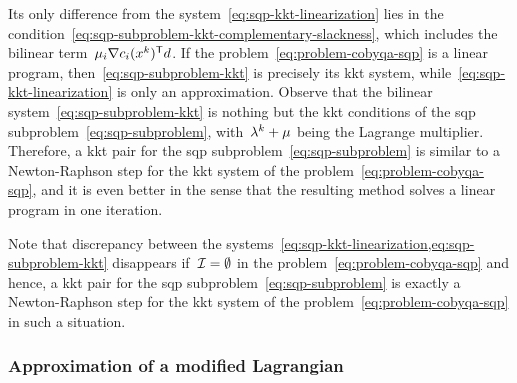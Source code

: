 Its only difference from the system~\cref{eq:sqp-kkt-linearization} lies in the condition~\cref{eq:sqp-subproblem-kkt-complementary-slackness}, which includes the bilinear term~$\mu_i \nabla \con{i}(\iter[k])^{\T} \step$.
If the problem~\cref{eq:problem-cobyqa-sqp} is a linear program, then~\cref{eq:sqp-subproblem-kkt} is precisely its \gls{kkt} system, while~\cref{eq:sqp-kkt-linearization} is only an approximation.
Observe that the bilinear system~\cref{eq:sqp-subproblem-kkt} is nothing but the \gls{kkt} conditions of the \gls{sqp} subproblem~\cref{eq:sqp-subproblem}, with~$\lm[k] + \mu$ being the Lagrange multiplier.
Therefore, a \gls{kkt} pair for the \gls{sqp} subproblem~\cref{eq:sqp-subproblem} is similar to a Newton-Raphson step for the \gls{kkt} system of the problem~\cref{eq:problem-cobyqa-sqp}, and it is even better in the sense that the resulting method solves a linear program in one iteration.

Note that discrepancy between the systems~\cref{eq:sqp-kkt-linearization,eq:sqp-subproblem-kkt} disappears if~$\mathcal{I} = \emptyset$ in the problem~\cref{eq:problem-cobyqa-sqp} and hence, a \gls{kkt} pair for the \gls{sqp} subproblem~\cref{eq:sqp-subproblem} is exactly a Newton-Raphson step for the \gls{kkt} system of the problem~\cref{eq:problem-cobyqa-sqp} in such a situation.

\subsubsection{Approximation of a modified Lagrangian}

